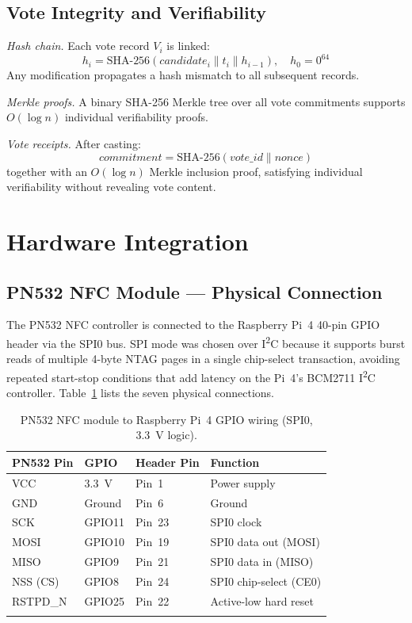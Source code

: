 \documentclass[pdflatex,sn-mathphys-num]{sn-jnl}%
\theoremstyle{thmstyleone}%
\theoremstyle{thmstyletwo}%
\theoremstyle{thmstylethree}%
\begin{document}
\subsection{Vote Integrity and Verifiability}\label{sec:vote_integrity}

\textit{Hash chain.} Each vote record \(V_i\) is linked:
\begin{equation}
  h_i = \mathrm{SHA\text{-}256}(\mathit{candidate}_i \| t_i \| h_{i-1}),
  \quad h_0 = 0^{64}
\end{equation}
Any modification propagates a hash mismatch to all subsequent records.

\textit{Merkle proofs.} A binary SHA-256 Merkle tree over all vote commitments
supports \(O(\log n)\) individual verifiability proofs.

\textit{Vote receipts.} After casting:
\begin{equation}
  \mathit{commitment} = \mathrm{SHA\text{-}256}(\mathit{vote\_id} \| \mathit{nonce})
\end{equation}
together with an \(O(\log n)\) Merkle inclusion proof, satisfying individual
verifiability without revealing vote content.

\section{Hardware Integration}\label{sec:hardware}

\subsection{PN532 NFC Module --- Physical Connection}

The PN532 NFC controller is connected to the Raspberry Pi~4 40-pin GPIO header
via the SPI0 bus. SPI mode was chosen over I\textsuperscript{2}C because it
supports burst reads of multiple 4-byte NTAG pages in a single chip-select
transaction, avoiding repeated start-stop conditions that add latency on the
Pi~4's BCM2711 I\textsuperscript{2}C controller. Table~\ref{tab:pn532_wiring}
lists the seven physical connections.

\begin{table}[t]
\caption{PN532 NFC module to Raspberry Pi~4 GPIO wiring (SPI0, 3.3~V logic).}
\label{tab:pn532_wiring}%
\begin{tabular}{@{}llll@{}}
  \toprule
  PN532 Pin & GPIO & Header Pin & Function \\
  \midrule
  VCC      & 3.3~V   & Pin~1  & Power supply \\
  GND      & Ground  & Pin~6  & Ground \\
  SCK      & GPIO11  & Pin~23 & SPI0 clock \\
  MOSI     & GPIO10  & Pin~19 & SPI0 data out (MOSI) \\
  MISO     & GPIO9   & Pin~21 & SPI0 data in (MISO) \\
  NSS (CS) & GPIO8   & Pin~24 & SPI0 chip-select (CE0) \\
  RSTPD\_N & GPIO25  & Pin~22 & Active-low hard reset \\
  \botrule
\end{tabular}
\end{table}
\end{document}
